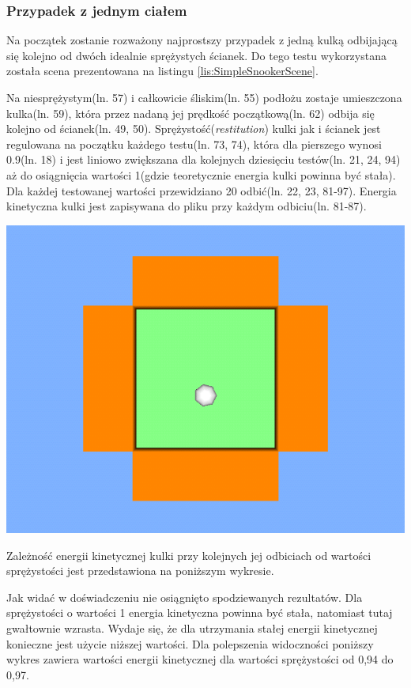 \subsubsection{Przypadek z jednym ciałem}
Na początek zostanie rozważony najprostszy przypadek z jedną kulką odbijającą
się kolejno od dwóch idealnie sprężystych ścianek. Do tego testu wykorzystana
została scena prezentowana na listingu \ref{lis:SimpleSnookerScene}.
 
Na niesprężystym(ln. 57) i całkowicie śliskim(ln. 55) podłożu zostaje
umieszczona kulka(ln. 59), która przez nadaną jej prędkość początkową(ln. 62)
odbija się kolejno od ścianek(ln. 49, 50). Sprężystość(\emph{restitution})
kulki jak i ścianek jest regulowana na początku każdego testu(ln. 73, 74),
która dla pierszego wynosi 0.9(ln. 18) i jest liniowo zwiększana dla kolejnych
dziesięciu testów(ln. 21, 24, 94) aż do osiągnięcia wartości 1(gdzie
teoretycznie energia kulki powinna być stała).
Dla każdej testowanej wartości przewidziano 20 odbić(ln. 22, 23, 81-97). Energia
kinetyczna kulki jest zapisywana do pliku przy każdym odbiciu(ln. 81-87).

\includegraphics[width=\textwidth]{./img/SimpleSnookerScene.png}

Zależność energii kinetycznej kulki przy kolejnych jej odbiciach od wartości
sprężystości jest przedstawiona na poniższym wykresie.



Jak widać w doświadczeniu nie osiągnięto spodziewanych rezultatów. Dla
sprężystości o wartości 1 energia kinetyczna powinna być stała, natomiast tutaj
gwałtownie wzrasta. Wydaje się, że dla utrzymania stałej energii kinetycznej
konieczne jest użycie niższej wartości. Dla polepszenia widoczności poniższy
wykres zawiera wartości energii kinetycznej dla wartości sprężystości od 0,94 do
0,97.

